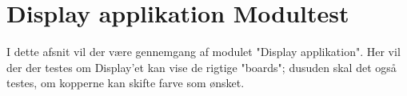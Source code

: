 \documentclass[Modultest/Modultest_main.tex]{subfiles}
\begin{document}
\section{Display applikation Modultest}
I dette afsnit vil der være gennemgang af modulet "Display applikation". Her vil der der testes om Display'et kan vise de rigtige "boards"; dusuden skal det også testes, om kopperne kan skifte farve som ønsket. 
\end{document}
